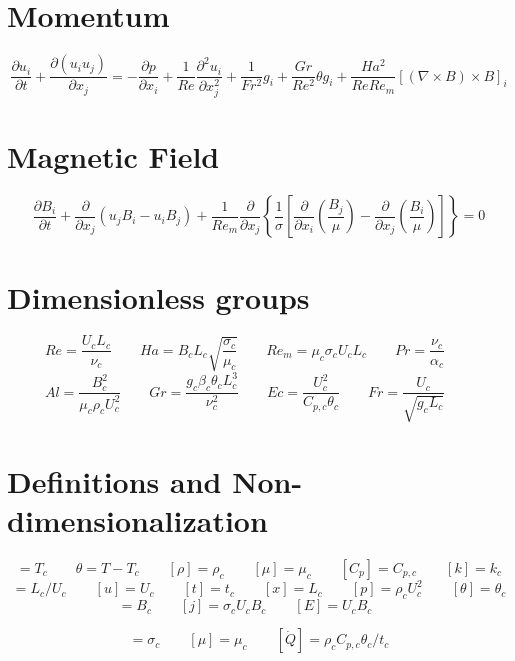 \documentclass[11pt]{article}
\begin{document}
\section{Momentum}
\begin{equation}
	\frac{\partial u_i}{\partial t} +
	\frac{\partial (u_i u_j)}{\partial x_j}
	=
	- \frac{\partial p}{\partial x_i}
	+ \frac{1}{Re}
	\frac{\partial^2 u_i}{\partial x_j^2}
	+ \frac{1}{Fr^2}
	g_i
	+ \frac{Gr}{Re^2}
	\theta g_i
	+ \frac{Ha^2}{Re Re_m}
	[(\nabla \times B) \times B]_i
\end{equation}
\section{Magnetic Field}
\begin{equation}
	\frac{\partial B_i}{\partial t}
	+ \frac{\partial}{\partial x_j} (u_j B_i - u_i B_j)
	+ \frac{1}{Re_m}
	\frac{\partial}{\partial x_j}
	\left\{ \frac{1}{\sigma}
	\left[
	\frac{\partial}{\partial x_i}
	\left( \frac{B_j}{\mu} \right) -
	\frac{\partial}{\partial x_j}
	\left( \frac{B_i}{\mu} \right)
	\right]
	\right\} = 0
\end{equation}

\section{Dimensionless groups}
\begin{equation}
	Re = \frac{U_c L_c}{\nu_c} \qquad
	Ha = B_c L_c \sqrt{\frac{\sigma_c}{\mu_c}} \qquad
	Re_m = \mu_c \sigma_c U_c L_c \qquad
	Pr = \frac{\nu_c}{\alpha_c} \qquad
\end{equation}
\begin{equation}
	Al = \frac{B_c^2}{\mu_c \rho_c U_c^2} \qquad
	Gr = \frac{g_c \beta_c \theta_c L_c^3}{\nu_c^2} \qquad
	Ec = \frac{U_c^2}{C_{p,c} \theta_c} \qquad
	Fr = \frac{U_c}{\sqrt{g_c L_c}} \qquad
\end{equation}
\section{Definitions and Non-dimensionalization}
\begin{equation}
	[T] = T_c \qquad
	\theta = T-T_c \qquad
	[\rho] = \rho_c \qquad
	[\mu] = \mu_c \qquad
	[C_p] = C_{p,c} \qquad
	[k] = k_c
\end{equation}
\begin{equation}
	[t_c] = L_c/U_c \qquad
	[u] = U_c \qquad
	[t] = t_c \qquad
	[x] = L_c \qquad
	[p] = \rho_c U_c^2 \qquad
	[\theta] = \theta_c
\end{equation}
\begin{equation}
	[B] = B_c  \qquad
	[j] = \sigma_c U_c B_c \qquad
	[E] = U_c B_c \qquad
\end{equation}

\begin{equation}
	[\sigma] = \sigma_c \qquad
	[\mu] = \mu_c \qquad
	[\dot{Q}] = \rho_c C_{p,c} \theta_c / t_c
\end{equation}
\end{document}
